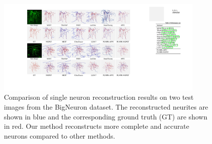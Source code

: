 \begin{figure}[th]
	\centering
	\includegraphics[width=0.9\textwidth]{./Illustrations/BigNeuron_comparison_v2.pdf}
	\caption{Comparison of single neuron reconstruction results on two test images from the BigNeuron dataset.
		The reconstructed neurites are shown in blue and the corresponding ground truth (GT) are shown in red.
		Our method reconstructs more complete and accurate neurons compared to other methods.
	}
	\label{fig:compare_BigNeuron}
\end{figure}

